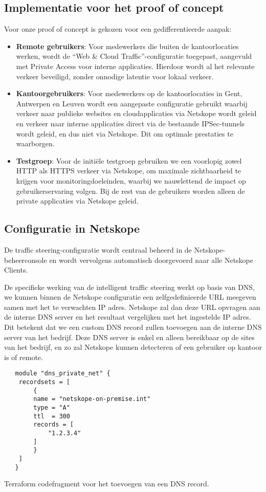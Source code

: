 \subsection{Implementatie voor het proof of concept}

Voor onze proof of concept is gekozen voor een gedifferentieerde aanpak:
\begin{itemize}
    \item \textbf{Remote gebruikers}: Voor medewerkers die buiten de kantoorlocaties werken, wordt de ``Web \& Cloud Traffic''-configuratie toegepast, aangevuld met Private Access voor interne applicaties. Hierdoor wordt al het relevante verkeer beveiligd, zonder onnodige latentie voor lokaal verkeer.

    \item \textbf{Kantoorgebruikers}: Voor medewerkers op de kantoorlocaties in Gent, Antwerpen en Leuven wordt een aangepaste configuratie gebruikt waarbij verkeer naar publieke websites en cloudapplicaties via Netskope wordt geleid en verkeer naar interne applicaties direct via de bestaande IPSec-tunnels wordt geleid, en dus niet via Netskope. Dit om optimale prestaties te waarborgen.

    \item \textbf{Testgroep}: Voor de initiële testgroep gebruiken we een voorlopig zowel HTTP als HTTPS verkeer via Netskope, om maximale zichtbaarheid te krijgen voor monitoringdoeleinden, waarbij we nauwlettend de impact op gebruikerservaring volgen. Bij de rest van de gebruikers worden alleen de private applicaties via Netskope geleid.
\end{itemize}
\subsection{Configuratie in Netskope}

De traffic steering-configuratie wordt centraal beheerd in de Netskope-beheerconsole en wordt vervolgens automatisch doorgevoerd naar alle Netskope Clients.

\vspace{2ex}

De specifieke werking van de intelligent traffic steering werkt op basis van DNS, we kunnen binnen de Netskope configuratie een zelfgedefinieerde URL meegeven samen met het te verwachten IP adres. Netskope zal dan deze URL opvragen aan de interne DNS server en het resultaat vergelijken met het ingestelde IP adres. Dit betekent dat we een custom DNS record zullen toevoegen aan de interne DNS server van het bedrijf. Deze DNS server is enkel en alleen bereikbaar op de sites van het bedrijf, en zo zal Netskope kunnen detecteren of een gebruiker op kantoor is of remote.
\begin{listing}[h!]
  \begin{verbatim}
   module "dns_private_net" {
    recordsets = [
        {
        name = "netskope-on-premise.int"
        type = "A"
        ttl  = 300
        records = [
            "1.2.3.4"
        ]
        }
    ]
   }
  \end{verbatim}
  \caption[Terraform codefragment DNS record]{Terraform codefragment voor het toevoegen van een DNS record.}
\end{listing}


